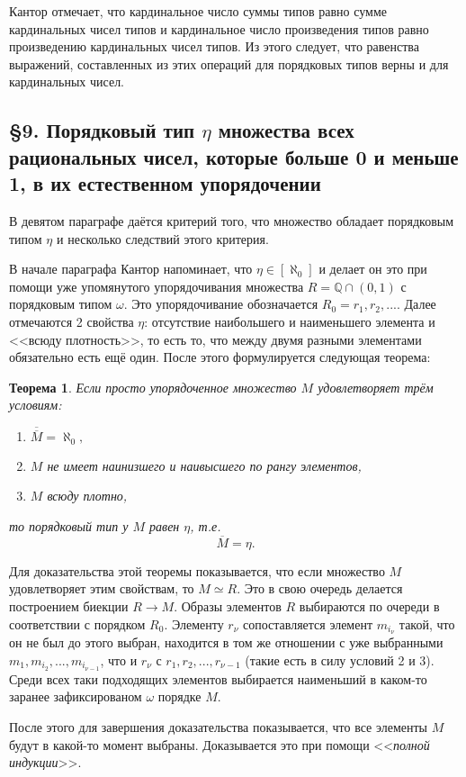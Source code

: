 \documentclass[a4paper,12pt]{extarticle}
\newtheorem{theorem}{Теорема}[subsection]
\theoremstyle{definition}
\newcommand{\cit}[1]{<<\textit{#1}>>}
\newcommand{\car}[1]{\overline{\overline{#1}}}
\begin{document}
Кантор отмечает, что кардинальное число суммы типов равно сумме кардинальных чисел типов и кардинальное число произведения типов равно произведению кардинальных чисел типов.
Из этого следует, что равенства выражений, составленных из этих операций для порядковых типов верны и для кардинальных чисел.

\subsection{\S 9. Порядковый тип $\eta$ множества всех рациональных чисел, которые больше 0 и меньше 1, в их естественном упорядочении}
В девятом параграфе даётся критерий того, что множество обладает порядковым типом $\eta$ и несколько следствий этого критерия.

В начале параграфа Кантор напоминает, что $\eta \in [\aleph_0]$ и делает он это при помощи
уже упомянутого упорядочивания множества $R = \mathbb{Q} \cap (0,1)$ с порядковым типом $\omega$.
Это упорядочивание обозначается $R_0 = {r_1, r_2, ...}$.
Далее отмечаются 2 свойства $\eta$: отсутствие наибольшего и наименьшего элемента и <<всюду плотность>>, то есть то, что между двумя разными элементами обязательно есть ещё один.
После этого формулируется следующая теорема:
\begin{theorem}
    Если просто упорядоченное множество $M$ удовлетворяет трём условиям:
    \begin{enumerate}
        \item $\car{M} = \aleph_0,$
        \item $M$ не имеет наинизшего и наивысшего по рангу элементов,
        \item $M$ всюду плотно,
    \end{enumerate}
    то порядковый тип у $M$ равен $\eta$, т.е. $$\overline{M} = \eta.$$
\end{theorem}
Для доказательства этой теоремы показывается, что если множество $M$ удовлетворяет этим свойствам, то $M \simeq R$.
Это в свою очередь делается построением биекции $R \rightarrow M$.
Образы элементов $R$ выбираются по очереди в соответствии с порядком $R_0$.
Элементу $r_\nu$ сопоставляется элемент $m_{i_\nu}$ такой, что он не был до этого выбран,
находится в том же отношении с уже выбранными $m_1, m_{i_2}, ..., m_{i_{\nu - 1}}$, что и $r_\nu$ с $r_1, r_2, ..., r_{\nu - 1}$ (такие есть в силу условий 2 и 3).
Среди всех таки подходящих элементов выбирается наименьший в каком-то заранее зафиксированом $\omega$ порядке $M$.

После этого для завершения доказательства показывается, что все элементы $M$ будут в какой-то момент выбраны.
Доказывается это при помощи \cit{полной индукции}.
\end{document}
